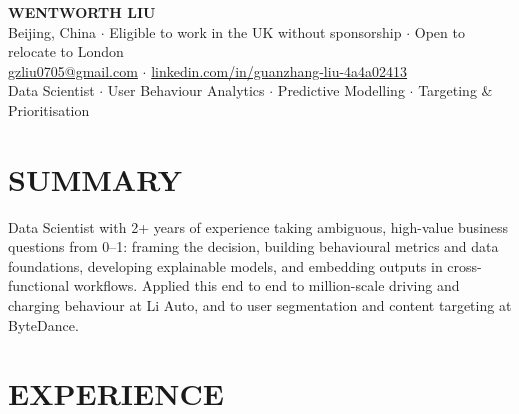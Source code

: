 \documentclass[a4paper,10pt]{article}
\begin{document}
\fontsize{8.8pt}{10.0pt}\selectfont

\begin{center}
    {\Large\bfseries WENTWORTH LIU}\\[2pt]
    {\small Beijing, China \;$\cdot$\; Eligible to work in the UK without sponsorship \;$\cdot$\; Open to relocate to London}\\[1pt]
    {\fontsize{8pt}{9pt}\selectfont \href{mailto:gzliu0705@gmail.com}{gzliu0705@gmail.com} \;$\cdot$\; \href{https://www.linkedin.com/in/guanzhang-liu-4a4a02413}{linkedin.com/in/guanzhang-liu-4a4a02413}}\\[2pt]
    {\small Data Scientist \;$\cdot$\; User Behaviour Analytics \;$\cdot$\; Predictive Modelling \;$\cdot$\; Targeting \& Prioritisation}
\end{center}

\vspace{-4pt}

\section{SUMMARY}
Data Scientist with 2+ years of experience taking ambiguous, high-value business questions from 0--1: framing the decision, building behavioural metrics and data foundations, developing explainable models, and embedding outputs in cross-functional workflows. Applied this end to end to million-scale driving and charging behaviour at Li Auto, and to user segmentation and content targeting at ByteDance.

\section{EXPERIENCE}
\end{document}
